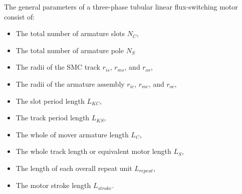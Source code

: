         
        The general parameters of a three-phase tubular linear flux-switching motor consist of:
        
        \begin{itemize}
            \item The total number of armature slots $N_C$,
            \item The total number of armature pole $N_S$
            \item The radii of the \acs{SMC} track $r_{is}$, $r_{ms}$, and $r_{os}$,
            \item The radii of the armature assembly $r_{ic}$, $r_{mc}$, and $r_{oc}$,
            \item The slot period length $L_{KC}$,
            \item The track period length $L_{KS}$,
            \item The whole of mover armature length $L_{C}$,
            \item The whole track length or equivalent motor length $L_{S}$,
            \item The length of each overall repeat unit $L_{repeat}$,
            \item The motor stroke length $L_{stroke}$.
        \end{itemize}
        

